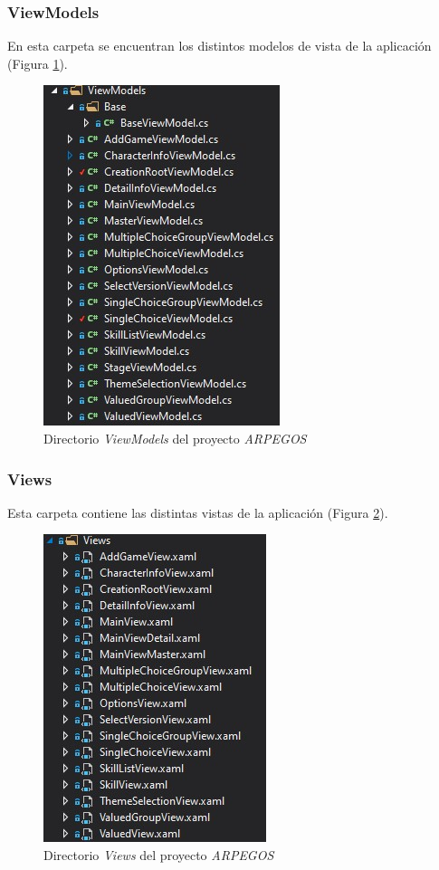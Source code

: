 {\subsubsection{ViewModels}
En esta carpeta se encuentran los distintos modelos de vista 
de la aplicación (Figura \ref*{ViewModels}).

\begin{figure}[H]
    \centering
    \includegraphics[scale=1.5]{Images/ARPEGOS_ViewModels.jpg}
    \caption{Directorio \textit{ViewModels} del proyecto \textit{ARPEGOS}}
    \label{ViewModels}    
\end{figure}

\subsubsection{Views}
Esta carpeta contiene las distintas vistas de la aplicación (Figura \ref*{Views}).

\begin{figure}[H]
    \centering
    \includegraphics[scale=1.5]{Images/ARPEGOS_Views.jpg}
    \caption{Directorio \textit{Views} del proyecto \textit{ARPEGOS}}
    \label{Views}    
\end{figure}

}
